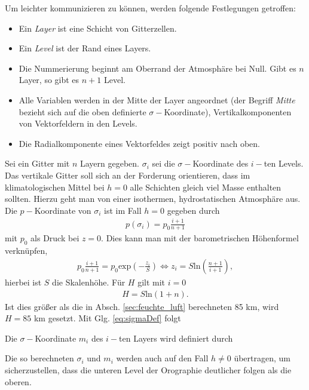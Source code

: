 \documentclass{book}
\renewcommand{\exp}{\text{exp}}
\renewcommand{\ln}{\text{ln}}
\begin{document}
Um leichter kommunizieren zu können, werden folgende Festlegungen getroffen:
%
\begin{itemize}
\item Ein \textit{Layer} ist eine Schicht von Gitterzellen.
\item Ein \textit{Level} ist der Rand eines Layers.
\item Die Nummerierung beginnt am Oberrand der Atmosphäre bei Null. Gibt es $n$ Layer, so gibt es $n + 1$ Level.
\item Alle Variablen werden in der Mitte der Layer angeordnet (der Begriff \textit{Mitte} bezieht sich auf die oben definierte $\sigma-$Koordinate), Vertikalkomponenten von Vektorfeldern in den Levels.
\item Die Radialkomponente eines Vektorfeldes zeigt positiv nach oben.
\end{itemize}
%
Sei ein Gitter mit $n$ Layern gegeben. $\sigma_i$ sei die $\sigma-$Koordinate des $i-$ten Levels. Das vertikale Gitter soll sich an der Forderung orientieren, dass im klimatologischen Mittel bei $h = 0$ alle Schichten gleich viel Masse enthalten sollten. Hierzu geht man von einer isothermen, hydrostatischen Atmosphäre aus. Die $p-$Koordinate von $\sigma_i$ ist im Fall $h = 0$ gegeben durch
%
\begin{eqnarray}
p\left(\sigma_i\right) = p_0\frac{i + 1}{n + 1}
\end{eqnarray}
%
mit $p_0$ als Druck bei $z = 0$. Dies kann man mit der barometrischen Höhenformel verknüpfen, 
%
\begin{eqnarray}
p_0\frac{i + 1}{n + 1} = p_0\exp\left(-\frac{z_i}{S}\right)\Leftrightarrow z_i = S\ln\left(\frac{n + 1}{i + 1}\right), 
\end{eqnarray}
%
hierbei ist $S$ die Skalenhöhe. Für $H$ gilt mit $i = 0$
%
\begin{eqnarray}
H = S\ln\left(1 + n\right).
\end{eqnarray}
%
Ist dies größer als die in Absch. \ref{sec:feuchte_luft} berechneten 85 km, wird $H = 85$ km gesetzt. Mit Glg. \eqref{eq:sigmaDef} folgt
%
\begin{center}
\doublebox{\parbox{0.8\textwidth}{
\begin{center}
\begin{eqnarray}
\sigma_i = \frac{S}{H}\ln\left(\frac{1 + n}{1 + i}\right).
\end{eqnarray}
\end{center}
}}
\end{center}
%
Die $\sigma-$Koordinate $m_i$ des $i-$ten Layers wird definiert durch
%
\begin{center}
\end{center}
%
Die so berechneten $\sigma_i$ und $m_i$ werden auch auf den Fall $h\not = 0$ übertragen, um sicherzustellen, dass die unteren Level der Orographie deutlicher folgen als die oberen.
\end{document}
